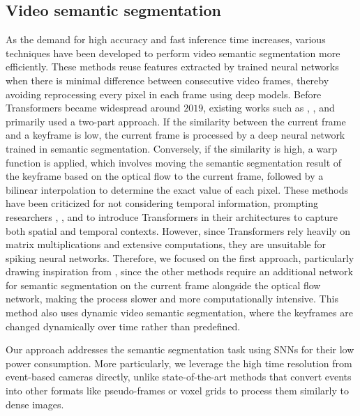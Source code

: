\subsection{Video semantic segmentation} %
As the demand for high accuracy and fast inference time increases, various techniques have been developed to perform video semantic segmentation more efficiently. These methods reuse features extracted by trained neural networks when there is minimal difference between consecutive video frames, thereby avoiding reprocessing every pixel in each frame using deep models. Before Transformers became widespread around $2019$, existing works such as \cite{xu2018dynamic}, \cite{li2018low}, \cite{zhu2017deep} and \cite{jain2019accel} primarily used a two-part approach. If the similarity between the current frame and a keyframe is low, the current frame is processed by a deep neural network trained in semantic segmentation.
Conversely, if the similarity is high, a warp function is applied, which involves moving the semantic segmentation result of the keyframe based on the optical flow to the current frame, followed by a bilinear interpolation to determine the exact value of each pixel. These methods have been criticized for not considering temporal information, prompting researchers \cite{wang2021end}, \cite{yang2022temporally}, and \cite{wu2022seqformer} to introduce Transformers in their architectures to capture both spatial and temporal contexts. However, since Transformers rely heavily on matrix multiplications and extensive computations, they are unsuitable for spiking neural networks. Therefore, we focused on the first approach, particularly drawing inspiration from \cite{xu2018dynamic}, since the other methods require an additional network for semantic segmentation on the current frame alongside the optical flow network, making the process slower and more computationally intensive. This method also uses dynamic video semantic segmentation, where the keyframes are changed dynamically over time rather than predefined.

\noindent Our approach addresses the semantic segmentation task using SNNs for their low power consumption. More particularly, we leverage the high time resolution from event-based cameras directly, unlike state-of-the-art methods that convert events into other formats like pseudo-frames or voxel grids \cite{gehrig2019end} to process them similarly to dense images.